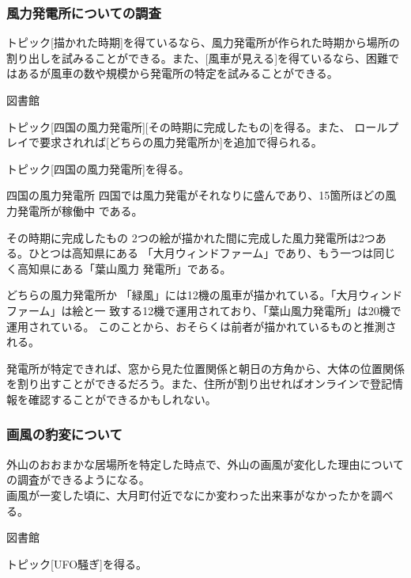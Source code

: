 \documentclass[a4paper,8pt,min]{jsarticle}
\begin{document}
\subsubsection{風力発電所についての調査}
トピック[描かれた時期]を得ているなら、風力発電所が作られた時期から場所の
割り出しを試みることができる。また、[風車が見える]を得ているなら、困難で
はあるが風車の数や規模から発電所の特定を試みることができる。

\begin{judge}{図書館}
 \item トピック[四国の風力発電所][その時期に完成したもの]を得る。また、
 ロールプレイで要求されれば[どちらの風力発電所か]を追加で得られる。
 \item トピック[四国の風力発電所]を得る。
\end{judge}

\begin{topic}
 \item[四国の風力発電所]
 四国では風力発電がそれなりに盛んであり、15箇所ほどの風力発電所が稼働中
 である。
 \item[その時期に完成したもの]
 2つの絵が描かれた間に完成した風力発電所は2つある。ひとつは高知県にある
 「大月ウィンドファーム」であり、もう一つは同じく高知県にある「葉山風力
 発電所」である。

 \item[どちらの風力発電所か]
 「緑風」には12機の風車が描かれている。「大月ウィンドファーム」は絵と一
 致する12機で運用されており、「葉山風力発電所」は20機で運用されている。
 このことから、おそらくは前者が描かれているものと推測される。
\end{topic}

発電所が特定できれば、窓から見た位置関係と朝日の方角から、大体の位置関係
を割り出すことができるだろう。また、住所が割り出せればオンラインで登記情
報を確認することができるかもしれない。

\subsubsection{画風の豹変について}
外山のおおまかな居場所を特定した時点で、外山の画風が変化した理由について
の調査ができるようになる。\\

画風が一変した頃に、大月町付近でなにか変わった出来事がなかったかを調べる。

\begin{judge}{図書館}
 \item トピック[UFO騒ぎ]を得る。
\end{judge}
\end{document}

